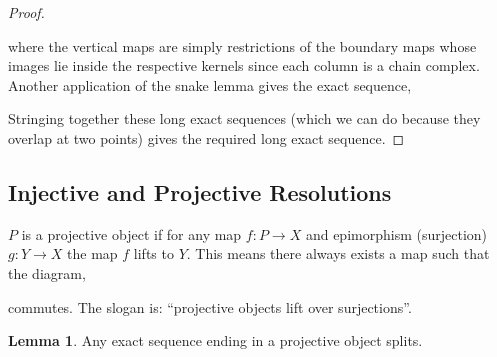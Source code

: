 \documentclass[12pt]{article}
\renewcommand{\Im}[1]{\mathrm{Im}(#1)}
\theoremstyle{remark}
\theoremstyle{definition}
\newtheorem{lemma}[theorem]{Lemma}
\newenvironment{definition}[1][Definition:]{\begin{trivlist}
\item[\hskip \labelsep {\bfseries #1}]}{\end{trivlist}}
\begin{document}
\begin{proof}
\begin{center}
\end{center}
where the vertical maps are simply restrictions of the boundary maps whose images lie inside the respective kernels since each column is a chain complex. Another application of the snake lemma gives the exact sequence,
\begin{center}
\end{center}
Stringing together these long exact sequences (which we can do because they overlap at two points) gives the required long exact sequence. 
\end{proof}

\subsection{Injective and Projective Resolutions}

\begin{definition}
$P$ is a projective object if for any map $f : P \to X$ and epimorphism (surjection) $g : Y \to X$ the map $f$ lifts to $Y$. This means there always exists a map such that the diagram,
\begin{center}
\end{center}
commutes. The slogan is: ``projective objects lift over surjections''.
\end{definition}


\begin{lemma}
Any exact sequence ending in a projective object splits.
\end{lemma}
\end{document}
